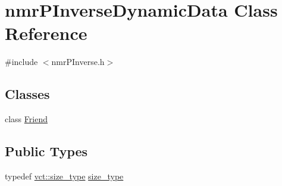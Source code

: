 \hypertarget{classnmr_p_inverse_dynamic_data}{\section{nmr\-P\-Inverse\-Dynamic\-Data Class Reference}
\label{classnmr_p_inverse_dynamic_data}
}


{\ttfamily \#include $<$nmr\-P\-Inverse.\-h$>$}

\subsection*{Classes}
\begin{DoxyCompactItemize}
\item 
class \hyperlink{classnmr_p_inverse_dynamic_data_1_1_friend}{Friend}
\end{DoxyCompactItemize}
\subsection*{Public Types}
\begin{DoxyCompactItemize}
\item 
typedef \hyperlink{namespacevct_a3e2935e13aac4500965e00d30565775b}{vct\-::size\-\_\-type} \hyperlink{classnmr_p_inverse_dynamic_data_a059041cc0fb800515bffe5bb351b01cb}{size\-\_\-type}
\end{DoxyCompactItemize}
